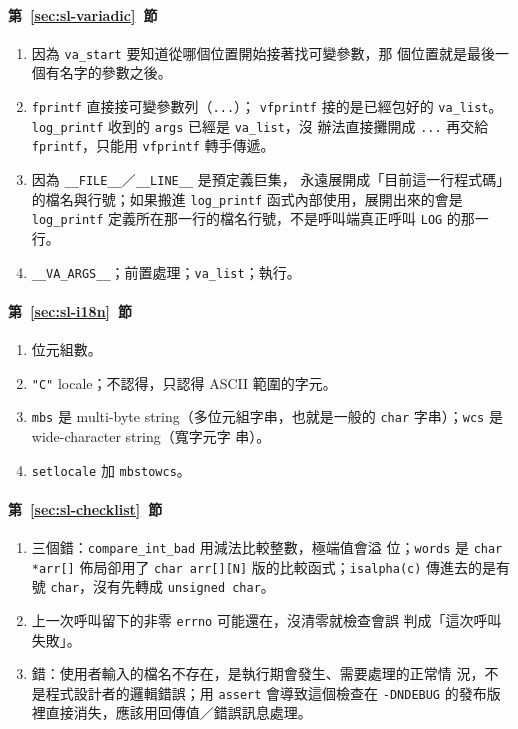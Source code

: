 \paragraph{第~\ref{sec:sl-variadic}~節}
\begin{enumerate}
\item 因為 \texttt{va\_start} 要知道從哪個位置開始接著找可變參數，那
個位置就是最後一個有名字的參數之後。
\item \texttt{fprintf} 直接接可變參數列（\texttt{...}）；
\texttt{vfprintf} 接的是已經包好的 \texttt{va\_list}。
\texttt{log\_printf} 收到的 \texttt{args} 已經是 \texttt{va\_list}，沒
辦法直接攤開成 \texttt{...} 再交給 \texttt{fprintf}，只能用
\texttt{vfprintf} 轉手傳遞。
\item 因為 \texttt{\_\_FILE\_\_}／\texttt{\_\_LINE\_\_} 是預定義巨集，
永遠展開成「目前這一行程式碼」的檔名與行號；如果搬進
\texttt{log\_printf} 函式內部使用，展開出來的會是
\texttt{log\_printf} 定義所在那一行的檔名行號，不是呼叫端真正呼叫
\texttt{LOG} 的那一行。
\item \texttt{\_\_VA\_ARGS\_\_}；前置處理；\texttt{va\_list}；執行。
\end{enumerate}

\paragraph{第~\ref{sec:sl-i18n}~節}
\begin{enumerate}
\item 位元組數。
\item \texttt{"C"} locale；不認得，只認得 ASCII 範圍的字元。
\item \texttt{mbs} 是 multi-byte string（多位元組字串，也就是一般的
\texttt{char} 字串）；\texttt{wcs} 是 wide-character string（寬字元字
串）。
\item \texttt{setlocale} 加 \texttt{mbstowcs}。
\end{enumerate}

\paragraph{第~\ref{sec:sl-checklist}~節}
\begin{enumerate}
\item 三個錯：\texttt{compare\_int\_bad} 用減法比較整數，極端值會溢
位；\texttt{words} 是 \texttt{char *arr[]} 佈局卻用了
\texttt{char arr[][N]} 版的比較函式；\texttt{isalpha(c)} 傳進去的是有
號 \texttt{char}，沒有先轉成 \texttt{unsigned char}。
\item 上一次呼叫留下的非零 \texttt{errno} 可能還在，沒清零就檢查會誤
判成「這次呼叫失敗」。
\item 錯：使用者輸入的檔名不存在，是執行期會發生、需要處理的正常情
況，不是程式設計者的邏輯錯誤；用 \texttt{assert} 會導致這個檢查在
\texttt{-DNDEBUG} 的發布版裡直接消失，應該用回傳值／錯誤訊息處理。
\end{enumerate}

